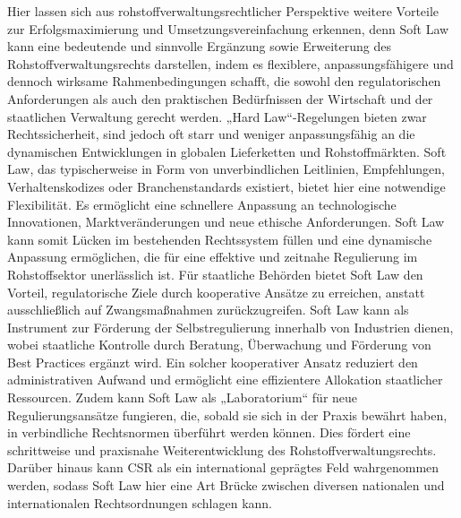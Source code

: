 \documentclass[12pt,a4paper,oneside]{book} %
\begin{document}
Hier lassen sich aus rohstoffverwaltungsrechtlicher Perspektive weitere Vorteile zur Erfolgsmaximierung und Umsetzungsvereinfachung erkennen, denn Soft Law kann eine bedeutende und sinnvolle Ergänzung sowie Erweiterung des Rohstoffverwaltungsrechts darstellen, indem es flexiblere, anpassungsfähigere und dennoch wirksame Rahmenbedingungen schafft, die sowohl den regulatorischen Anforderungen als auch den praktischen Bedürfnissen der Wirtschaft und der staatlichen Verwaltung gerecht werden. „Hard Law“-Regelungen bieten zwar Rechtssicherheit, sind jedoch oft starr und weniger anpassungsfähig an die dynamischen Entwicklungen in globalen Lieferketten und Rohstoffmärkten. Soft Law, das typischerweise in Form von unverbindlichen Leitlinien, Empfehlungen, Verhaltenskodizes oder Branchenstandards existiert, bietet hier eine notwendige Flexibilität. Es ermöglicht eine schnellere Anpassung an technologische Innovationen, Marktveränderungen und neue ethische Anforderungen. Soft Law kann somit Lücken im bestehenden Rechtssystem füllen und eine dynamische Anpassung ermöglichen, die für eine effektive und zeitnahe Regulierung im Rohstoffsektor unerlässlich ist. Für staatliche Behörden bietet Soft Law den Vorteil, regulatorische Ziele durch kooperative Ansätze zu erreichen, anstatt ausschließlich auf Zwangsmaßnahmen zurückzugreifen. Soft Law kann als Instrument zur Förderung der Selbstregulierung innerhalb von Industrien dienen, wobei staatliche Kontrolle durch Beratung, Überwachung und Förderung von Best Practices ergänzt wird. Ein solcher kooperativer Ansatz reduziert den administrativen Aufwand und ermöglicht eine effizientere Allokation staatlicher Ressourcen. Zudem kann Soft Law als „Laboratorium“ für neue Regulierungsansätze fungieren, die, sobald sie sich in der Praxis bewährt haben, in verbindliche Rechtsnormen überführt werden können. Dies fördert eine schrittweise und praxisnahe Weiterentwicklung des Rohstoffverwaltungsrechts. Darüber hinaus kann CSR als ein international geprägtes Feld wahrgenommen werden, sodass Soft Law hier eine Art Brücke zwischen diversen nationalen und internationalen Rechtsordnungen schlagen kann.
\end{document}
